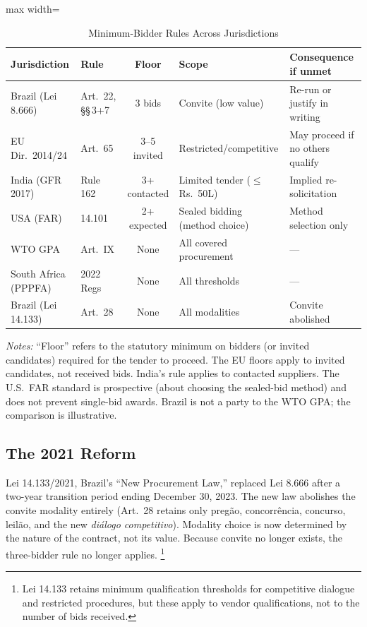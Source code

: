 \begin{table}[htbp]
\centering
\caption{Minimum-Bidder Rules Across Jurisdictions}
\label{tab:crosscountry}
\begin{adjustbox}{max width=\textwidth}
\begin{threeparttable}
\small
\begin{tabular}{llcll}
\toprule
Jurisdiction & Rule & Floor & Scope & Consequence if unmet \\
\midrule
Brazil (Lei 8.666) & Art.\ 22, \S\S\,3+7 & 3 bids & Convite (low value) & Re-run or justify in writing \\
EU Dir.\ 2014/24 & Art.\ 65 & 3--5 invited & Restricted/competitive & May proceed if no others qualify \\
India (GFR 2017) & Rule 162 & 3+ contacted & Limited tender ($\leq$ Rs.\ 50L) & Implied re-solicitation \\
USA (FAR) & 14.101 & 2+ expected & Sealed bidding (method choice) & Method selection only \\
WTO GPA & Art.\ IX & None & All covered procurement & --- \\
South Africa (PPPFA) & 2022 Regs & None & All thresholds & --- \\
Brazil (Lei 14.133) & Art.\ 28 & None & All modalities & Convite abolished \\
\bottomrule
\end{tabular}
\begin{tablenotes}
\small
\item \textit{Notes:} ``Floor'' refers to the statutory minimum
on bidders (or invited candidates) required for the tender to
proceed. The EU floors apply to invited candidates, not received
bids. India's rule applies to contacted suppliers. The U.S.\ FAR
standard is prospective (about choosing the sealed-bid method) and
does not prevent single-bid awards. Brazil is not a party to the
WTO GPA; the comparison is illustrative.
\end{tablenotes}
\end{threeparttable}
\end{adjustbox}
\end{table}

\subsection{The 2021 Reform}
\label{sec:lei14133}

Lei 14.133/2021, Brazil's ``New Procurement Law,'' replaced
Lei 8.666 after a two-year transition period ending December 30,
2023. The new law abolishes the convite modality entirely
(Art.~28 retains only preg\~ao, concorr\^encia, concurso,
leil\~ao, and the new \emph{di\'alogo competitivo}). Modality
choice is now determined by the nature of the contract, not its
value. Because convite no longer exists, the three-bidder rule
no longer applies.%
\footnote{Lei 14.133 retains minimum qualification thresholds
for competitive dialogue and restricted procedures, but these
apply to vendor qualifications, not to the number of bids
received.}

